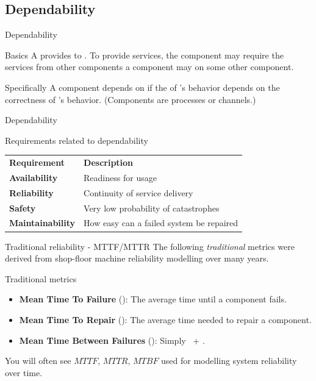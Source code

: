 \subsection{Dependability}
\begin{frame}{Dependability}
  \begin{block}{Basics}
    A  provides  to .  To provide services, the component may
    require the services from other components \mathexpr{\Rightarrow} a component may  on some
    other component.
  \end{block}
  \begin{block}{Specifically}
    A component  depends on  if the  of 's behavior depends on the
    correctness of 's behavior. (Components are processes or channels.)
  \end{block}
\end{frame}
\begin{frame}{Dependability}
  \begin{block}{Requirements related to dependability}
    \begin{center}
      \begin{tabular}{|l|l|}\hline
        \textbf{Requirement}     & \textbf{Description}                     \\ \whline
        \textbf{Availability}    & Readiness for usage                      \\ \hline
        \textbf{Reliability}     & Continuity of service delivery           \\ \hline
        \textbf{Safety}          & Very low probability of catastrophes     \\ \hline
        \textbf{Maintainability} & How easy can a failed system be repaired \\ \hline
      \end{tabular}
    \end{center}
  \end{block}
\end{frame}

\begin{frame}{Traditional reliability - MTTF/MTTR}
  The following \emph{traditional} metrics were derived from
  shop-floor machine reliability modelling over many years.
  \begin{block}{Traditional metrics}
    \begin{itemize}\firmlist
      \item \textbf{Mean Time To Failure} (\blue{\MTTF}): The average time until a component fails.
      \item \textbf{Mean Time To Repair} (\blue{\MTTR}): The average time needed to repair a component.
      \item \textbf{Mean Time Between Failures} (\blue{\MTBF}): Simply \MTTF\ + \MTTR.
    \end{itemize}
  \end{block}
  You will often see $MTTF$, $MTTR$, $MTBF$ used for modelling
  system reliability over time.
\end{frame}

